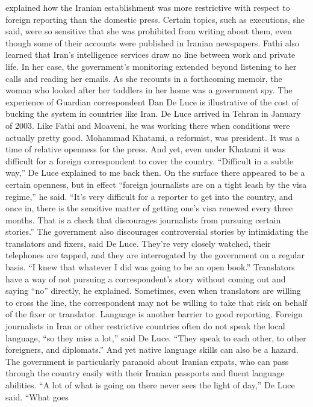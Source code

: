 explained how the Iranian establishment was more restrictive with respect to foreign
reporting than the domestic press. Certain topics, such as executions, she said, were so
sensitive that she was prohibited from writing about them, even though some of their
accounts were published in Iranian newspapers. Fathi also learned that Iran’s intelligence
services draw no line between work and private life. In her case, the government’s
monitoring extended beyond listening to her calls and reading her emails. As she recounts
in a forthcoming memoir, the woman who looked after her toddlers in her home was a
government spy.
The experience of Guardian correspondent Dan De Luce is illustrative of the cost of
bucking the system in countries like Iran. De Luce arrived in Tehran in January of 2003.
Like Fathi and Moaveni, he was working there when conditions were actually pretty
good. Mohammad Khatami, a reformist, was president. It was a time of relative openness
for the press. And yet, even under Khatami it was difficult for a foreign correspondent to
cover the country.
``Difficult in a subtle way,'' De Luce explained to me back then. On the surface there
appeared to be a certain openness, but in effect ``foreign journalists are on a tight leash by
the visa regime,'' he said. ``It’s very difficult for a reporter to get into the country, and
once in, there is the sensitive matter of getting one’s visa renewed every three months.
That is a check that discourages journalists from pursuing certain stories.''
The government also discourages controversial stories by intimidating the translators and
fixers, said De Luce. They’re very closely watched, their telephones are tapped, and they
are interrogated by the government on a regular basis. ``I knew that whatever I did was
going to be an open book.''
Translators have a way of not pursuing a correspondent’s story without coming out and
saying ``no'' directly, he explained. Sometimes, even when translators are willing to cross
the line, the correspondent may not be willing to take that risk on behalf of the fixer or
translator.
Language is another barrier to good reporting. Foreign journalists in Iran or other
restrictive countries often do not speak the local language, ``so they miss a lot,'' said De
Luce. ``They speak to each other, to other foreigners, and diplomats.'' And yet native
language skills can also be a hazard. The government is particularly paranoid about
Iranian expats, who can pass through the country easily with their Iranian passports and
fluent language abilities.
``A lot of what is going on there never sees the light of day,'' De Luce said. ``What goes
